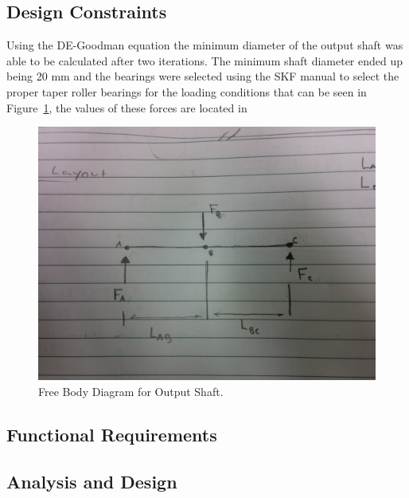 \subsection{Design Constraints}
Using the DE-Goodman equation the minimum diameter of the output shaft was able to be calculated after two iterations. The minimum shaft diameter ended up being 20 mm and the bearings were selected using the SKF manual to select the proper taper roller bearings for the loading conditions that can be seen in Figure~\ref{fig:fb_output_shaft}, the values of these forces are located in 
\begin{figure}[htbp]
	\includegraphics[width=\linewidth]{images/fb_output_shaft.jpg}
	\caption{Free Body Diagram for Output Shaft.}
	\label{fig:fb_output_shaft}
\end{figure}
\subsection{Functional Requirements}
\subsection{Analysis and Design}